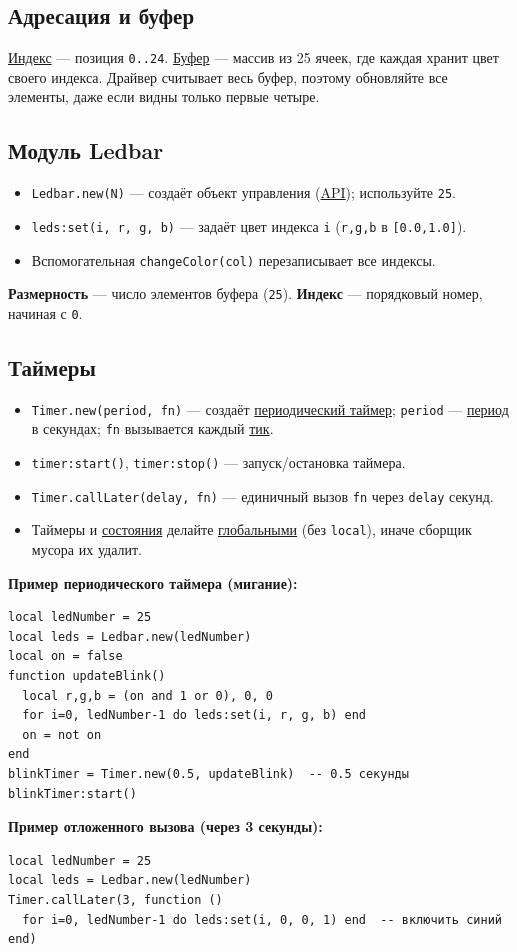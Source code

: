 \subsection{Адресация и буфер}
\hyperlink{term:index}{Индекс} — позиция \verb|0..24|. \hyperlink{term:buffer}{Буфер} — массив из 25 ячеек, где каждая хранит цвет своего индекса. Драйвер считывает весь буфер, поэтому обновляйте все элементы, даже если видны только первые четыре.

\subsection{Модуль Ledbar}
\begin{itemize}
  \item \verb|Ledbar.new(N)| — создаёт объект управления (\hyperlink{term:api}{API}); используйте \verb|25|.
  \item \verb|leds:set(i, r, g, b)| — задаёт цвет индекса \verb|i| (\verb|r,g,b| в \verb|[0.0,1.0]|).
  \item Вспомогательная \verb|changeColor(col)| перезаписывает все индексы.
\end{itemize}
\textbf{Размерность} — число элементов буфера (\verb|25|). \textbf{Индекс} — порядковый номер, начиная с \verb|0|.

\subsection{Таймеры}
\begin{itemize}
  \item \verb|Timer.new(period, fn)| — создаёт \hyperlink{term:timer}{периодический таймер}; \verb|period| — \hyperlink{term:period}{период} в секундах; \verb|fn| вызывается каждый \hyperlink{term:tick}{тик}.
  \item \verb|timer:start()|, \verb|timer:stop()| — запуск/остановка таймера.
  \item \verb|Timer.callLater(delay, fn)| — единичный вызов \verb|fn| через \verb|delay| секунд.
  \item Таймеры и \hyperlink{term:state}{состояния} делайте \hyperlink{term:scope}{глобальными} (без \verb|local|), иначе сборщик мусора их удалит.
\end{itemize}
\textbf{Пример периодического таймера (мигание):}
\begin{verbatim}
local ledNumber = 25
local leds = Ledbar.new(ledNumber)
local on = false
function updateBlink()
  local r,g,b = (on and 1 or 0), 0, 0
  for i=0, ledNumber-1 do leds:set(i, r, g, b) end
  on = not on
end
blinkTimer = Timer.new(0.5, updateBlink)  -- 0.5 секунды
blinkTimer:start()
\end{verbatim}
\textbf{Пример отложенного вызова (через 3 секунды):}
\begin{verbatim}
local ledNumber = 25
local leds = Ledbar.new(ledNumber)
Timer.callLater(3, function ()
  for i=0, ledNumber-1 do leds:set(i, 0, 0, 1) end  -- включить синий
end)
\end{verbatim}


